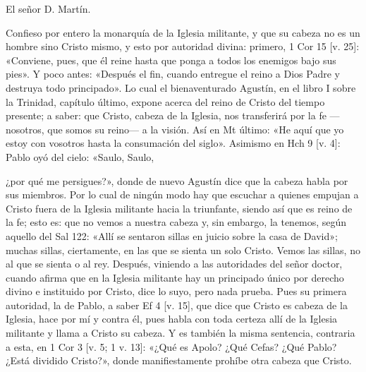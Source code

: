 El señor D. Martín.

Confieso por entero la monarquía de la Iglesia militante, y que su cabeza no es un hombre sino Cristo mismo, y esto por autoridad divina: primero, 1 Cor 15 [v. 25]: «Conviene, pues, que él reine hasta que ponga a todos los enemigos bajo sus pies». Y poco antes: «Después el fin, cuando entregue el reino a Dios Padre y destruya todo principado». Lo cual el bienaventurado Agustín, en el libro I sobre la Trinidad, capítulo último, expone acerca del reino de Cristo del tiempo presente; a saber: que Cristo, cabeza de la Iglesia, nos transferirá por la fe —nosotros, que somos su reino— a la visión. Así en Mt último: «He aquí que yo estoy con vosotros hasta la consumación del siglo». Asimismo en Hch 9 [v. 4]: Pablo oyó del cielo: «Saulo, Saulo,

¿por qué me persigues?», donde de nuevo Agustín dice que la cabeza habla por sus miembros. Por lo cual de ningún modo hay que escuchar a quienes empujan a Cristo fuera de la Iglesia militante hacia la triunfante, siendo así que es reino de la fe; esto es: que no vemos a nuestra cabeza y, sin embargo, la tenemos, según aquello del Sal 122: «Allí se sentaron sillas en juicio sobre la casa de David»; muchas sillas, ciertamente, en las que se sienta un solo Cristo. Vemos las sillas, no al que se sienta o al rey. Después, viniendo a las autoridades del señor doctor, cuando afirma que en la Iglesia militante hay un principado único por derecho divino e instituido por Cristo, dice lo suyo, pero nada prueba. Pues su primera autoridad, la de Pablo, a saber Ef 4 [v. 15], que dice que Cristo es cabeza de la Iglesia, hace por mí y contra él, pues habla con toda certeza allí de la Iglesia militante y llama a Cristo su cabeza. Y es también la misma sentencia, contraria a esta, en 1 Cor 3 [v. 5; 1 v. 13]: «¿Qué es Apolo? ¿Qué Cefas? ¿Qué Pablo? ¿Está dividido Cristo?», donde manifiestamente prohíbe otra cabeza que Cristo.

